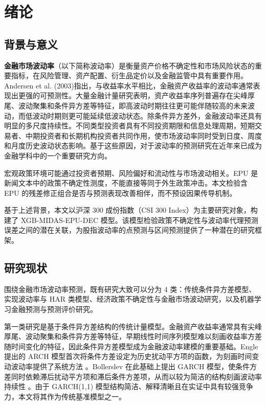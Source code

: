 \section{绪论}

\subsection{背景与意义}

\textbf{金融市场波动率}（以下简称波动率）是衡量资产价格不确定性和市场风险状态的重要指标，在风险管理、资产配置、衍生品定价以及金融监管中具有重要作用。Andersen et al. (2003)指出，与收益率水平相比，金融资产收益率的波动率通常表现出更强的可预测性。大量金融计量研究表明，资产收益率序列普遍存在尖峰厚尾、波动聚集和条件异方差等特征，即高波动时期往往更可能伴随较高的未来波动，而低波动时期则更可能延续低波动状态。除条件异方差外，金融波动率还具有明显的多尺度持续性。不同类型投资者具有不同投资期限和信息处理周期，短期交易者、中期投资者和长期机构投资者共同作用，使市场波动率同时受到日度、周度和月度历史波动状态影响。基于这些原因，对于波动率的预测研究在近年来已成为金融学科中的一个重要研究方向。

宏观政策环境可能通过投资者预期、风险偏好和流动性与市场波动相关。EPU 是新闻文本中的政策不确定性测度，不能直接等同于外生政策冲击。本文检验含 EPU 的残差修正组合是否与预测表现改善相伴，而不预设因果传导机制。

基于上述背景，本文以沪深 300 成份指数（CSI 300 Index）为主要研究对象，构建了 XGB-MIDAS-EPU-DEC 模型。该模型检验政策不确定性与波动率代理预测误差之间的潜在关联，为股指波动率的点预测与区间预测提供了一种潜在的研究框架。

\subsection{研究现状}

围绕金融市场波动率预测，既有研究大致可以分为 4 类：传统条件异方差模型、实现波动率与 HAR 类模型、经济政策不确定性与金融市场波动研究，以及机器学习金融预测与预测评价研究。

第一类研究是基于条件异方差结构的传统计量模型。金融资产收益率通常具有尖峰厚尾、波动聚集和条件异方差等特征，早期线性时间序列模型难以刻画收益率方差随时间变化的特征，因此条件异方差模型成为金融波动率建模的重要基础。Engle 提出的 ARCH 模型首次将条件方差设定为历史扰动平方项的函数，为刻画时间变动波动率提供了系统方法 \citep{Engle1982}。Bollerslev 在此基础上提出 GARCH 模型，使条件方差同时依赖滞后扰动平方项和滞后条件方差项，从而以较为简洁的结构刻画波动率持续性 \citep{Bollerslev1986}。由于 GARCH(1,1) 模型结构简洁、解释清晰且在实证中具有较强竞争力，本文将其作为传统基准模型之一。

